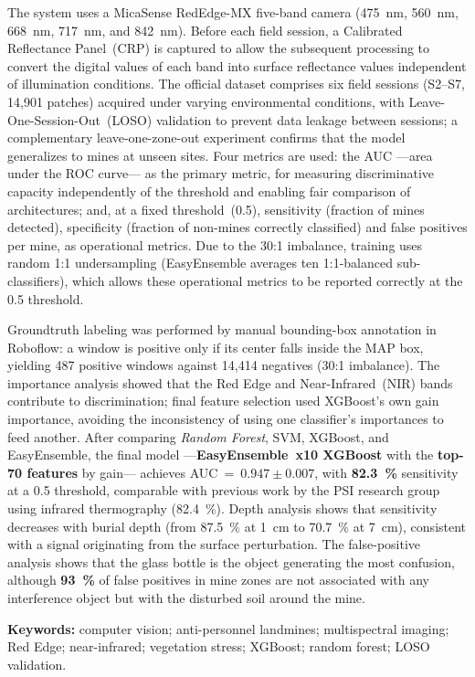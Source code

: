 The system uses a MicaSense RedEdge-MX five-band camera (\SI{475}{nm}, \SI{560}{nm},
\SI{668}{nm}, \SI{717}{nm}, and \SI{842}{nm}). Before each field session, a Calibrated
Reflectance Panel~(CRP) is captured to allow the subsequent processing to convert the
digital values of each band into surface reflectance values independent of illumination
conditions. The official dataset comprises six field sessions (S2--S7, 14,901 patches)
acquired under varying environmental conditions, with Leave-One-Session-Out~(LOSO)
validation to prevent data leakage between sessions; a complementary leave-one-zone-out
experiment confirms that the model generalizes to mines at unseen sites. Four metrics are used: the \ac{AUC} ---area under the ROC curve--- as the primary
metric, for measuring discriminative capacity independently of the threshold and
enabling fair comparison of architectures; and, at a fixed threshold~(0.5),
sensitivity (fraction of mines detected), specificity (fraction of non-mines
correctly classified) and false positives per mine, as operational metrics. Due to
the 30:1 imbalance, training uses random 1:1 undersampling (EasyEnsemble averages
ten 1:1-balanced sub-classifiers), which allows these operational metrics to be
reported correctly at the 0.5 threshold.

Groundtruth labeling was performed by manual bounding-box annotation in Roboflow:
a window is positive only if its center falls inside the \ac{MAP} box, yielding 487
positive windows against 14,414 negatives (30:1 imbalance). The importance analysis showed that the Red Edge and Near-Infrared~(NIR) bands
contribute to discrimination; final feature selection used XGBoost's own gain importance,
avoiding the inconsistency of using one classifier's importances to feed another. After comparing
\textit{Random Forest}, \ac{SVM}, XGBoost, and EasyEnsemble, the final model
---\textbf{EasyEnsemble~x10 XGBoost} with the \textbf{top-70 features} by gain---
achieves AUC~=~$0.947 \pm 0.007$, with \textbf{82.3~\%} sensitivity at a 0.5
threshold, comparable with previous work by the PSI research group using infrared
thermography (82.4~\%). Depth analysis shows that sensitivity decreases with burial
depth (from 87.5~\% at 1~cm to 70.7~\% at 7~cm), consistent with a signal
originating from the surface perturbation. The false-positive analysis shows that
the glass bottle is the object generating the most confusion, although \textbf{93~\%}
of false positives in mine zones are not associated with any interference object but with
the disturbed soil around the mine.

\vspace{6pt}
\noindent\textbf{Keywords:} computer vision; anti-personnel landmines; multispectral
imaging; Red Edge; near-infrared; vegetation stress; XGBoost; random forest;
LOSO validation.

\clearpage
